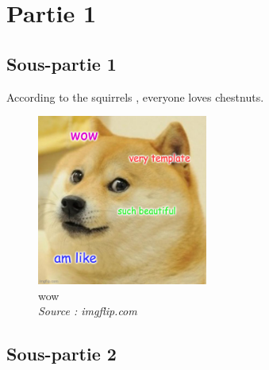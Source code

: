 \section{Partie 1}

\subsection{Sous-partie 1}

According to the squirrels \cite{einstein}, everyone loves chestnuts.

\lipsum

\begin{figure}[h]
	\centering
    \includegraphics[width=0.5\textwidth]{images/example.jpg}
	\caption{wow\\\emph{Source : imgflip.com}}
	\label{fig:wow}
\end{figure}

\lipsum

\subsection{Sous-partie 2}

\lipsum